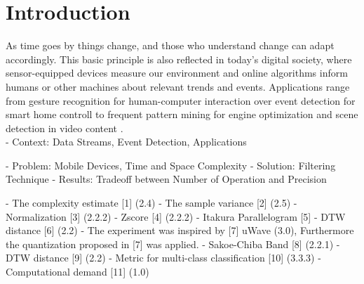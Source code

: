 \newpage
\section{Introduction} \label{introduction}

As time goes by things change, and those who understand change can adapt accordingly. This basic principle is also reflected in today's digital society, where sensor-equipped devices measure our environment and online algorithms inform humans or other machines about relevant trends and events. Applications range from gesture recognition for human-computer interaction \cite{liu2009uwave} over event detection for smart home controll \cite{spiegel2015metering} to frequent pattern mining for engine optimization \cite{spiegel2015driving} and scene detection in video content \cite{acar2011mediaeval} . \\




- Context: Data Streams, Event Detection, Applications


- Problem: Mobile Devices, Time and Space Complexity
- Solution: Filtering Technique
- Results: Tradeoff between Number of Operation and Precision




- The complexity estimate [1] (2.4)
- The sample variance [2] (2.5)
- Normalization [3] (2.2.2)
- Zscore [4] (2.2.2)
- Itakura Parallelogram [5]
- DTW distance [6] (2.2)
- The experiment was inspired by [7] uWave (3.0), Furthermore the quantization proposed in [7] was applied.
- Sakoe-Chiba Band [8] (2.2.1)
- DTW distance [9] (2.2)
- Metric for multi-class classification [10] (3.3.3)
- Computational demand [11] (1.0)





